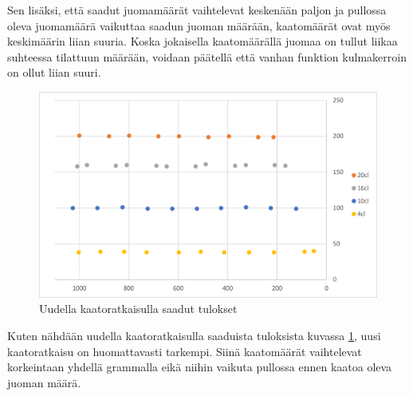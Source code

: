 Sen lisäksi, että saadut juomamäärät vaihtelevat keskenään paljon ja pullossa oleva juomamäärä vaikuttaa saadun juoman määrään, kaatomäärät ovat myös keskimäärin liian suuria. Koska jokaisella kaatomäärällä juomaa on tullut liikaa suhteessa tilattuun määrään, voidaan päätellä että vanhan funktion kulmakerroin on ollut liian suuri.

\begin{figure}[h]
\begin{center}
\includegraphics[scale=0.25]{img/kaadot_uusi.pdf}
\end{center}
\caption{Uudella kaatoratkaisulla saadut tulokset}
\label{fig:kaadot_uusi}
\end{figure}

Kuten nähdään uudella kaatoratkaisulla saaduista tuloksista kuvassa \ref{fig:kaadot_uusi}, uusi kaatoratkaisu on huomattavasti tarkempi. Siinä kaatomäärät vaihtelevat korkeintaan yhdellä grammalla eikä niihin vaikuta pullossa ennen kaatoa oleva juoman määrä.

